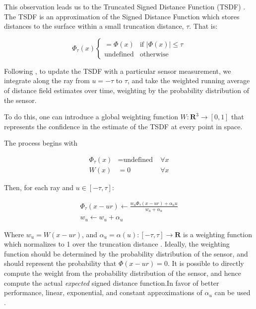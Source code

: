 This observation leads us to the Truncated Signed Distance Function (TSDF)
\cite{Curless1996}. The TSDF is an approximation of the  Signed Distance
Function which stores distances to the surface within a small truncation
distance, $\tau$. That is:

\begin{equation} 
\Phi_{\tau}(x) \begin{cases}
	 = \Phi(x) & \text{if } |\Phi(x)| \leq \tau \\ 
	 \text{undefined} & \text{otherwise}
	 \end{cases}
\end{equation}

Following \cite{Curless1996}, to update the TSDF with a particular sensor
measurement, we integrate along the ray from $u = -\tau$ to $\tau$, and take the
weighted running average of distance field estimates over time, weighting by the
probability distribution of the sensor.

To do this, one can introduce a global weighting function $W : \mathbf{R}^3 \to
[0, 1]$ that represents the confidence in the estimate of the TSDF at every
point in space.

The process begins with 

\begin{align}
\Phi_{\tau}(x)& = \text{undefined} \;&\forall x  \\
%
 W(x)&= 0 \; &\forall x 
\end{align}

Then, for each ray and $u\in[-\tau, \tau]$:

\begin{subequations}
\begin{align}
\Phi_{\tau}(x - ur) \gets \frac{w_u \Phi_{\tau}(x - ur) + \alpha_u u}{w_u
+\alpha_u}
\\
%
w_u \gets w_u+ \alpha _u
\end{align}
\label{eqn:update}
\end{subequations}

\noindent Where  $w_u = W(x - ur)$, and $\alpha_u  = \alpha(u) : [-\tau,\tau]\to
\mathbf{R} $ is a weighting function which normalizes to 1 over the truncation
distance . Ideally, the weighting function should be determined by the
probability distribution of the sensor, and should represent the probability
that $\Phi(x - ur) = 0$. It is possible \cite{Nguyen2012} to directly compute
the weight from the probability distribution of the sensor, and hence compute
the actual \emph{expected} signed distance function.In favor of better
performance, linear, exponential, and constant approximations of $\alpha_u$ can be used \cite{Curless1996, Newcombe,
Whelan2013, Bylow2013}.

